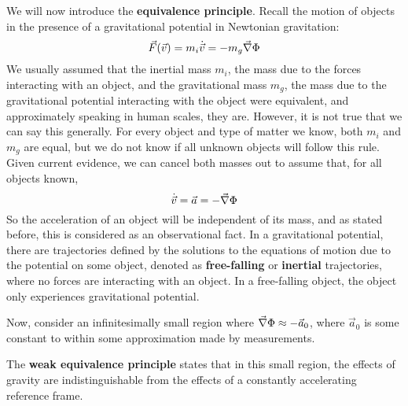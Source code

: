 \documentclass{article}
\begin{document}
 		We will now introduce the \textbf{equivalence principle}. Recall the motion of objects in the presence of a gravitational potential in Newtonian gravitation:
 		$$ \vec{F}(\vec{v}) = m_i \dot{\vec{v}} = - m_g \vec{\nabla}\Phi$$
 		We usually assumed that the inertial mass $m_i$, the mass due to the forces interacting with an object, and the gravitational mass $m_g$, the mass due to the gravitational potential interacting with the object were equivalent, and approximately speaking in human scales, they are. However, it is not true that we can say this generally. For every object and type of matter we know, both $m_i$ and $m_g$ are equal, but we do not know if all unknown objects will follow this rule. Given current evidence, we can cancel both masses out to assume that, for all objects known,
 		$$ \dot{\vec{v}} = \vec{a} = - \vec{\nabla} \Phi$$
 		So the acceleration of an object will be independent of its mass, and as stated before, this is considered as an observational fact. In a gravitational potential, there are trajectories defined by the solutions to the equations of motion due to the potential on some object, denoted as \textbf{free-falling} or \textbf{inertial} trajectories, where no forces are interacting with an object. In a free-falling object, the object only experiences gravitational potential.
 		
 		Now, consider an infinitesimally small region where $\vec{\nabla}\Phi \approx -\vec{a}_0$, where $\vec{a}_0$ is some constant to within some approximation made by measurements. 
 		
 		\begin{defn}
 			\label{defn:WeakEquivalence}
 			The \textbf{weak equivalence principle} states that in this small region, the effects of gravity are indistinguishable from the effects of a constantly accelerating reference frame.
 		\end{defn}
 	
\end{document}
